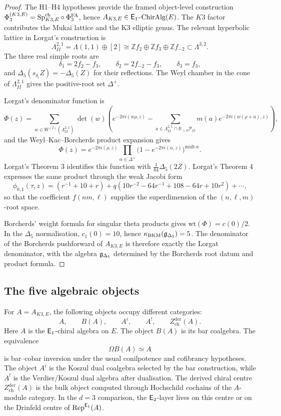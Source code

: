 \begin{proof}
The H1--H4 hypotheses provide the framed object-level construction
\(\Phi_3^{(K3,E)}=\mathrm{Sp}^{\mathrm{ch}}_{K3,E}\circ\Phi^{\mathrm{FA}}_3\), hence
\(A_{K3,E}\in\mathsf{E}_1\)-\(\mathrm{ChirAlg}(E)\).  The \(K3\) factor contributes
the Mukai lattice and the K3 elliptic genus.  The relevant hyperbolic
lattice in Lorgat's construction is
\[
  \Lambda^{2,1}_{II}
  =
  \Lambda(1,1)\oplus[2]
  \cong
  \mathbb Z f_2\oplus\mathbb Z f_3\oplus\mathbb Z f_{-2}
  \subset \Lambda^{3,2}.
\]
The three real simple roots are
\[
  \delta_1=2f_2-f_3,\qquad
  \delta_2=2f_{-2}-f_3,\qquad
  \delta_3=f_3,
\]
and \(\Delta_5(s_{\delta_i}Z)=-\Delta_5(Z)\) for their reflections.
The Weyl chamber in the cone of \(\Lambda^{2,1}_{II}\) gives the
positive-root set \(\Delta^+\).

Lorgat's denominator function is
\[
  \Phi(z)
  =
  \sum_{w\in W^{(2)}(\Lambda^{2,1}_{II})}
  \det(w)
  \left(
    e^{-2\pi i(w\rho,z)}
    -
    \sum_{a\in \Lambda^{2,1}_{II}\cap \mathbb R_{>0}\mathcal P_{II}}
    m(a)e^{-2\pi i(w(\rho+a),z)}
  \right),
\]
and the Weyl--Kac--Borcherds product expansion gives
\[
  \Phi(z)
  =
  e^{-2\pi i(\rho,z)}
  \prod_{\alpha\in\Delta^+}
  \bigl(1-e^{-2\pi i(\alpha,z)}\bigr)^{\mathrm{mult}\,\alpha}.
\]
Lorgat's Theorem 3 identifies this function with
\(\frac{1}{64}\Delta_5(2Z)\).  Lorgat's Theorem 4 expresses the same
product through the weak Jacobi form
\[
  \phi_{0,1}(\tau,z)
  =
  (r^{-1}+10+r)
  +
  q(10r^{-2}-64r^{-1}+108-64r+10r^2)+\cdots ,
\]
so that the coefficient \(f(nm,\ell)\) supplies the superdimension of
the \((n,\ell,m)\)-root space.

Borcherds' weight formula for singular theta products gives
\(\mathrm{wt}(\Phi)=c(0)/2\).  In the \(\Delta_5\) normalisation,
\(c_1(0)=10\), hence \(\kappa_{\mathrm{BKM}}(\mathfrak{g}_{\Delta_5})=5\).  The denominator of
the Borcherds pushforward of \(A_{K3,E}\) is therefore exactly the
Lorgat denominator, with the algebra \(\mathfrak{g}_{\Delta_5}\) determined by
the Borcherds root datum and product formula.
\end{proof}

\subsection*{The five algebraic objects}

For \(A=A_{K3,E}\), the following objects occupy different categories:
\[
  A,\qquad B(A),\qquad A^i,\qquad A^!,\qquad
  Z_{\mathrm{ch}}^{\mathrm{der}}(A).
\]
Here \(A\) is the \(\mathsf{E}_1\)-chiral algebra on \(E\).  The object
\(B(A)\) is its bar coalgebra.  The equivalence
\[
  \Omega B(A)\simeq A
\]
is bar--cobar inversion under the usual conilpotence and cofibrancy
hypotheses.  The object \(A^i\) is the Koszul dual coalgebra selected
by the bar construction, while \(A^!\) is the Verdier/Koszul dual
algebra after dualisation.  The derived chiral centre
\(Z_{\mathrm{ch}}^{\mathrm{der}}(A)\) is the bulk object computed
through Hochschild cochains of the \(A\)-module category.  In the
\(d=3\) comparison, the \(\mathsf{E}_2\)-layer lives on this centre or on the
Drinfeld centre of \(\mathrm{Rep}^{\mathsf{E}_1}(A)\).

